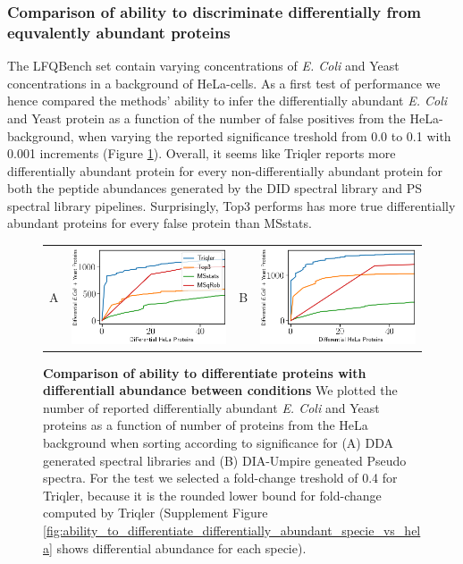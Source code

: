 \documentclass[10pt,letterpaper]{article}
\begin{document}
\subsubsection*{Comparison of ability to discriminate differentially from equvalently abundant proteins}

The LFQBench set contain varying concentrations of {\em E. Coli} and Yeast concentrations in a background of HeLa-cells. As a first test of performance we hence compared the methods' ability to infer the differentially abundant {\em E. Coli} and Yeast protein as a function of the number of false positives from the HeLa-background, when varying the reported significance treshold from 0.0 to 0.1 with 0.001 increments (Figure \ref{fig:diff_vs_hela}). Overall, it seems like Triqler reports more differentially abundant protein for every non-differentially abundant protein for both the peptide abundances generated by the DID spectral library and PS spectral library pipelines. Surprisingly, Top3 performs has more true differentially abundant proteins for every false protein than MSstats. 


\begin{figure}[hbt]
    \centering
    \begin{tabular}{lclc} 
        A & \includegraphics[width=0.45\linewidth]{../../result/report_plots_filtered/osw_de_human_vs_ecoli_and_yeast.png} & 
        B & \includegraphics[width=0.45\linewidth]{../../result/report_plots_filtered/diann_de_human_vs_ecoli_and_yeast.png} \\ 

    \end{tabular} 
    \caption{{\bf Comparison of ability to differentiate proteins with differentiall abundance between conditions} We plotted the number of reported differentially abundant  {\em E. Coli} and Yeast proteins as a function of number of proteins from the HeLa background when sorting according to significance for (A) DDA generated spectral libraries and (B) DIA-Umpire geneated Pseudo spectra. For the test we selected a fold-change treshold of 0.4 for Triqler, because it is the rounded lower bound for fold-change computed by Triqler (Supplement Figure \ref{fig:ability_to_differentiate_differentially_abundant_specie_vs_hela} shows differential abundance for each specie). \label{fig:diff_vs_hela}}
\end{figure}
\end{document}
